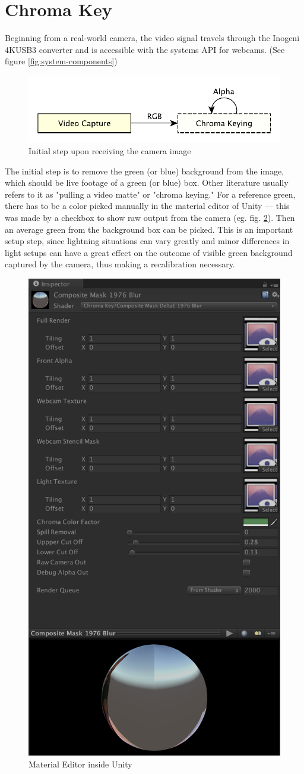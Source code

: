%
\section{Chroma Key}
\label{sec:chromakey}

Beginning from a real-world camera, the video signal travels through the 
Inogeni 4KUSB3 converter and is accessible with the systems API for webcams. 
(See figure \ref{fig:system-components})

\begin{figure}[htb]
	\centering
	\includegraphics[width=.7\textwidth]{gfx/pipeline/4_1_chroma.pdf}
	\caption{Initial step upon receiving the camera image}
	\label{fig:steps:chroma}
\end{figure}

The initial step is to remove the green (or blue) background from the image, 
which should be live footage of a green (or blue) box. Other literature usually 
refers to it as "pulling a video matte" or "chroma keying." For a reference 
green, there has to be a color picked manually in the material editor of Unity 
--- this was made by a checkbox to show raw output from the camera (eg. fig. 
\ref{fig:chroma:editor}). Then an average green from the background box can be 
picked. This is an important setup step, since lightning situations can vary 
greatly and minor differences in light setups can have a great effect on the 
outcome of visible green background captured by the camera, thus making a 
recalibration necessary.

\begin{figure}[htb]
	\centering
	\includegraphics[width=.45\textwidth]{gfx/distances/material-editor.png}
	\caption{Material Editor inside Unity}
	\label{fig:chroma:editor}
\end{figure}

